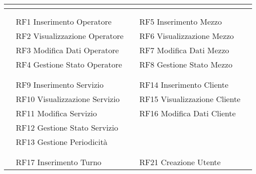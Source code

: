 \documentclass[green, fancy, 11pt]{elegantbook}
\begin{document}
\begin{table}[H]
	\footnotesize
\centering
\begin{tabular}{|p{0.2cm} p{2.5cm} p{2cm} p{0.2cm} p{2.5cm} p{1cm} p{0.2cm}|}
	\hline
	\multicolumn{7}{|c|}{\cellcolor{DarkGreen}{\textcolor{white}{REQUISITI FUNZIONALI}}}\\
	\hline
	&&&&&&\\
	\cline{2-3} \cline{5-6}
	&\multicolumn{2}{|l|}{\cellcolor{RussianGreen}{\textcolor{white}{GESTIONE OPERATORI}}}&&\multicolumn{2}{|l|}{\cellcolor{RussianGreen}{\textcolor{white}{GESTIONE MEZZI}}}&\\
	\cline{2-3} \cline{5-6}
	&\multicolumn{2}{|l|}{RF1 Inserimento Operatore}&&\multicolumn{2}{|l|}{RF5 Inserimento Mezzo}&\\
	&\multicolumn{2}{|l|}{RF2 Visualizzazione Operatore}&&\multicolumn{2}{|l|}{RF6 Visualizzazione Mezzo}&\\
	&\multicolumn{2}{|l|}{RF3 Modifica Dati Operatore}&&\multicolumn{2}{|l|}{RF7  Modifica Dati Mezzo}&\\
	&\multicolumn{2}{|l|}{RF4 Gestione Stato Operatore}&&\multicolumn{2}{|l|}{RF8  Gestione Stato Mezzo}&\\
	\cline{5-6}
	\cline{2-3}
	&&&&&&\\
	\cline{2-3} \cline{5-6}
	&\multicolumn{2}{|l|}{\cellcolor{RussianGreen}{\textcolor{white}{GESTIONE SERVIZI}}}&&\multicolumn{2}{|l|}{\cellcolor{RussianGreen}{\textcolor{white}{GESTIONE CLIENTI}}}&\\
	\cline{2-3} \cline{5-6}
	&\multicolumn{2}{|l|}{RF9 Inserimento Servizio}&&\multicolumn{2}{|l|}{RF14 Inserimento Cliente}&\\
	&\multicolumn{2}{|l|}{RF10 Visualizzazione Servizio}&&\multicolumn{2}{|l|}{RF15 Visualizzazione Cliente}&\\
	&\multicolumn{2}{|l|}{RF11 Modifica Servizio}&&\multicolumn{2}{|l|}{RF16 Modifica Dati Cliente}&\\
	\cline{5-6}
	&\multicolumn{2}{|l|}{RF12 Gestione Stato Servizio}&&&&\\
	&\multicolumn{2}{|l|}{RF13 Gestione Periodicità}&&&&\\
	\cline{2-3}
	&&&&&&\\
	\cline{2-3} \cline{5-6}
	&\multicolumn{2}{|l|}{\cellcolor{RussianGreen}{\textcolor{white}{GESTIONE TURNI}}}&&\multicolumn{2}{|l|}{\cellcolor{RussianGreen}{\textcolor{white}{GESTIONE UTENTI}}}&\\
	\cline{2-3} \cline{5-6}
	&\multicolumn{2}{|l|}{RF17 Inserimento Turno}&&\multicolumn{2}{|l|}{RF21 Creazione Utente}&\\

\end{tabular}
\end{table}
\end{document}
